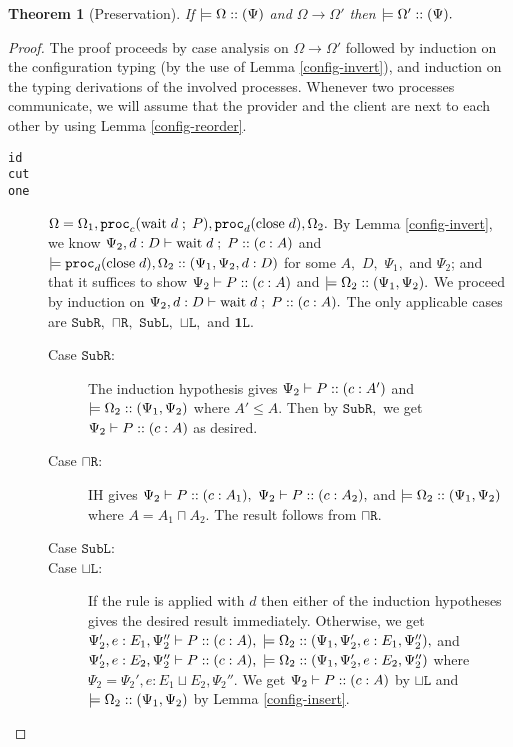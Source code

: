 \documentclass[11pt]{article}
\theoremstyle{plain}
\newtheorem{theorem}{Theorem}[section]
\theoremstyle{definition}
\theoremstyle{remark}
\DeclarePairedDelimiter\parens{(}{)}             %
\newcommand\sub{\le}
\newcommand\terminate{\mathbf{1}}
\newcommand\intersect{\mathbin{\sqcap}}
\newcommand\union{\mathbin{\sqcup}}
\newcommand\seq{\;;\;}
\newcommand\tclose[1]{\mathrm{close}\;#1}
\newcommand\twait[2]{\mathrm{wait}\;#1 \seq #2}
\newcommand\irb[1]{\texttt{#1}}
\newcommand\Right{\irb{R}}
\newcommand\Left{\irb{L}}
\newcommand{\ctx}{\Psi}
\newcommand{\config}{\Omega}
\newcommand\typeProc[3]{#1 :: \parens{#2 : #3}}
\newcommand\typeS[4]{#1 \vdash \typeProc{#2}{#3}{#4}}
\newcommand\stepArrow{\longrightarrow}
\newcommand\steps[2]{#1 \stepArrow #2}
\newcommand\proc[2]{\irb{proc}_{#1}\parens{#2}}
\newcommand\provides[2]{\models #1 :: \parens{#2}}
\begin{document}
\begin{theorem}[Preservation]
If $\provides{\config}{\ctx}$ and $\steps{\config}{\config'}$ then $\provides{\config'}{\ctx}.$
\end{theorem}
\begin{proof}
  The proof proceeds by case analysis on $\steps{\config}{\config'}$ followed by induction on the configuration typing (by the use of Lemma \ref{config-invert}), and induction on the typing derivations of the involved processes. Whenever two processes communicate, we will assume that the provider and the client are next to each other by using Lemma \ref{config-reorder}.
  \begin{description}
    \item[\irb{id}]
    \item[\irb{cut}]
    \item[\irb{one}] $\Omega = \Omega_1, \proc{c}{\twait{d}{P}}, \proc{d}{\tclose d}, \Omega_2.$ By Lemma \ref{config-invert}, we know $\typeS{\ctx_2, d : D}{\twait{d}{P}}{c}{A}$ and $\provides{\proc{d}{\tclose d}, \Omega_2}{\ctx_1, \ctx_2, d : D}$ for some $A,$ $D,$ $\ctx_1,$ and $\ctx_2$; and that it suffices to show $\typeS{\ctx_2}{P}{c}{A}$ and $\provides{\Omega_2}{\ctx_1, \ctx_2}.$ We proceed by induction on $\typeS{\ctx_2, d : D}{\twait{d}{P}}{c}{A}.$ The only applicable cases are $\irb{Sub}\Right,$ $\intersect\Right,$ $\irb{Sub}\Left,$ $\union\Left,$ and $\terminate\Left.$

    \begin{description}
      \item[Case $\irb{Sub}\Right:$] The induction hypothesis gives $\typeS{\ctx_2}{P}{c}{A'}$ and $\provides{\Omega_2}{\ctx_1, \ctx_2}$ where $A' \sub A.$ Then by $\irb{Sub}\Right,$ we get $\typeS{\ctx_2}{P}{c}{A}$ as desired.

      \item[Case $\intersect\Right:$] IH gives $\typeS{\ctx_2}{P}{c}{A_1},$ $\typeS{\ctx_2}{P}{c}{A_2},$ and $\provides{\Omega_2}{\ctx_1, \ctx_2}$ where $A = A_1 \intersect A_2.$ The result follows from $\intersect\Right.$

      \item[Case $\irb{Sub}\Left:$]
      \item[Case $\union\Left:$] If the rule is applied with $d$ then either of the induction hypotheses gives the desired result immediately. Otherwise, we get $\typeS{\ctx_2', e : E_1, \ctx_2''}{P}{c}{A},$ $\provides{\Omega_2}{\ctx_1, \ctx_2', e : E_1, \ctx_2''},$ and $\typeS{\ctx_2', e : E_2, \ctx_2''}{P}{c}{A},$ $\provides{\Omega_2}{\ctx_1, \ctx_2', e : E_2, \ctx_2''}$ where $\ctx_2 = \ctx_2', e : E_1 \union E_2, \ctx_2''.$ We get $\typeS{\ctx_2}{P}{c}{A}$ by $\union\Left$ and $\provides{\Omega_2}{\ctx_1, \ctx_2}$ by Lemma \ref{config-insert}.


\end{description}
\end{description}
\end{proof}
\end{document}
